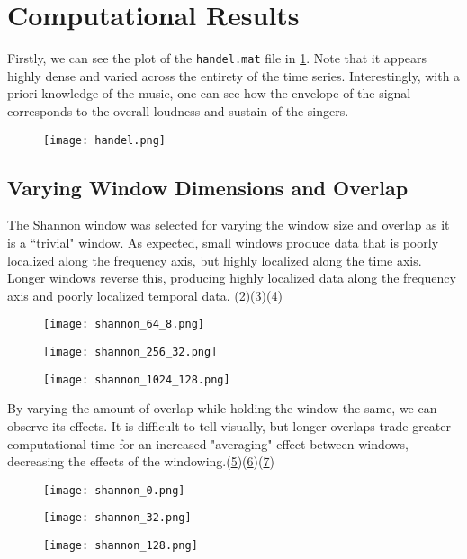 \documentclass[journal]{IEEEtran}
\def\code#1{\texttt{#1}}
\begin{document}
\section{Computational Results}

Firstly, we can see the plot of the \code{handel.mat} file in \ref{handel}. Note that it appears highly dense and varied across the entirety of the time series. Interestingly,
with a priori knowledge of the music, one can see how the envelope of the signal corresponds to the overall loudness and sustain of the singers.

\begin{figure}
	\centerline{\texttt{[image: handel.png]}}
	\label{handel}
\end{figure}

\subsection{Varying Window Dimensions and Overlap}
The Shannon window was selected for varying the window size and overlap as it is a ``trivial" window. As expected, small windows produce data that is poorly localized along the frequency
axis, but highly localized along the time axis. Longer windows reverse this, producing highly localized data along the frequency axis and poorly localized temporal data.
(\ref{shannon_64_8})(\ref{shannon_256_32})(\ref{shannon_1024_128})

\begin{figure}
	\centerline{\texttt{[image: shannon\_64\_8.png]}}
	\caption{}
	\label{shannon_64_8}
\end{figure}
\begin{figure}
	\centerline{\texttt{[image: shannon\_256\_32.png]}}
	\caption{}
	\label{shannon_256_32}
\end{figure}
\begin{figure}
	\centerline{\texttt{[image: shannon\_1024\_128.png]}}
	\caption{}
	\label{shannon_1024_128}
\end{figure}

By varying the amount of overlap while holding the window the same, we can observe its effects. It is difficult to tell visually, but longer overlaps trade greater computational time for
an increased "averaging" effect between windows, decreasing the effects of the windowing.(\ref{shannon0})(\ref{shannon32})(\ref{shannon128})

\begin{figure}
	\centerline{\texttt{[image: shannon\_0.png]}}
	\caption{}
	\label{shannon0}
\end{figure}
\begin{figure}
	\centerline{\texttt{[image: shannon\_32.png]}}
	\caption{}
	\label{shannon32}
\end{figure}
\begin{figure}
	\centerline{\texttt{[image: shannon\_128.png]}}
	\caption{}
	\label{shannon128}
\end{figure}
\end{document}
